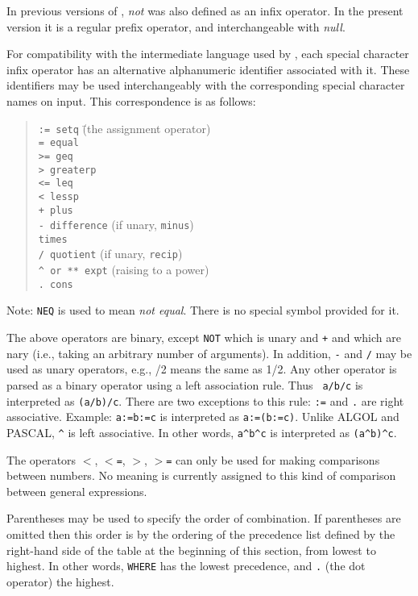 In previous versions of {\REDUCE}, {\em not} was also defined as an infix
operator.  In the present version it is a regular prefix operator, and
interchangeable with {\em null}.

For compatibility with the intermediate language used by {\REDUCE}, each
special character infix operator has an alternative
alphanumeric identifier associated with it.  These identifiers may be used
interchangeably with the corresponding special character names on input.
This correspondence is as follows:
\begin{quote}
\begin{tabbing}
{\tt :=      setq} \hspace{0.5in} \= (the assignment operator) \\
{\tt =       equal} \\
{\tt >=      geq} \\
{\tt >       greaterp} \\
{\tt <=      leq} \\
{\tt <       lessp} \\
{\tt +       plus} \\
{\tt -       difference} \> (if unary, {\tt minus}) \\
{\tt *       times} \\
{\tt /       quotient} \> (if unary, {\tt recip}) \\
{\tt \verb|^| or ** expt} \> (raising to a power) \\
{\tt .       cons}
\end{tabbing}
\end{quote}
Note: {\tt NEQ} is used to mean {\em not equal}.  There is no special
symbol provided for it.

The above operators are binary, except {\tt NOT} which is
unary and {\tt +} and {\tt *} which are nary (i.e., taking an arbitrary
number of arguments).  In addition, {\tt -} and {\tt /} may be used as
unary operators, e.g., /2 means the same as 1/2.  Any other operator is
parsed as a binary operator using a left association rule.  Thus {\tt
a/b/c} is interpreted as {\tt (a/b)/c}.  There are two exceptions to this
rule: {\tt :=} and {\tt .} are right associative.  Example: {\tt a:=b:=c}
is interpreted as {\tt a:=(b:=c)}.  Unlike ALGOL and PASCAL, {\tt \verb|^|} is
left associative.  In other words, {\tt a\verb|^|b\verb|^|c} is interpreted as
{\tt (a\verb|^|b)\verb|^|c}.

The operators {\tt $<$}, {\tt $<$=}, {\tt $>$}, {\tt $>$=}
can only be used for making comparisons between numbers.  No meaning is
currently assigned to this kind of comparison between general expressions.

Parentheses may be used to specify the order of combination.  If
parentheses are omitted then this order is by the ordering of the
precedence list defined by the right-hand side
of the {\tt <infix operator>} table
at the beginning of this section,
from lowest to highest.  In other words, {\tt WHERE} has the lowest
precedence, and {\tt .} (the dot operator) the highest.


